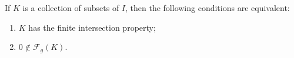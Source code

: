 If $K$ is a collection of subsets of $I$, then the following conditions are equivalent:

\begin{enumerate}
\item[(i)] $K$ has the finite intersection property;
\item[(ii)] $0 \notin \mathcal{F}_g(K)$.
\end{enumerate}
